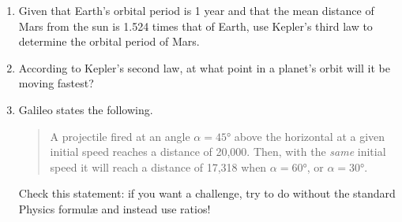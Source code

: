 \begin{exercises}{}{}
\begin{enumerate}
	  \item%
	  Given that Earth's orbital period is 1 year and that the mean distance of Mars from the sun is 1.524 times that of Earth, use Kepler's third law to determine the orbital period of Mars.
	  
	  \item%
	  According to Kepler's second law, at what point in a planet's orbit will it be moving fastest?
	  
	  \item%
	  Galileo states the following.
	  \begin{quote}
	  	A projectile fired at an angle $\alpha=\ang{45}$ above the horizontal at a given initial speed reaches a distance of 20,000. Then, with the \emph{same} initial speed it will reach a distance of 17,318 when $\alpha=\ang{60}$, or $\alpha=\ang{30}$.
	  \end{quote}
	  Check this statement: if you want a challenge, try to do without the standard Physics formulæ and instead use ratios!
	\end{enumerate}
\end{exercises}